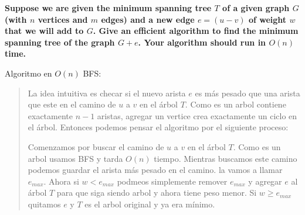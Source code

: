 \textbf{Suppose we are given the minimum spanning tree $T$ of a given graph $G$ (with $n$ vertices and $m$ edges) and a new edge $e = (u - v)$ of weight $w$ that we will add to $G$. Give an efficient algorithm to find the minimum spanning tree of the graph $G + e$. Your algorithm should run in $O(n)$ time.}\vspace{.2cm}

\textcolor{bibi}{Algoritmo en $O(n)$ BFS:} 
\begin{quote}
    La idea intuitiva es checar si el nuevo arista $e$ es más pesado que una arista que este en el camino de $u$ a $v$ en el árbol $T$. Como es un arbol contiene exactamente $n-1$ aristas, agregar un vertice crea exactamente un ciclo en el árbol. Entonces podemos pensar el algoritmo por el siguiente proceso: \vspace{.2cm}

    Comenzamos por buscar el camino de $u$ a $v$ en el árbol $T$. Como es un arbol usamos BFS y tarda $O(n)$ tiempo. Mientras buscamos este camino podemos guardar el arista más pesado en el camino. la vamos a llamar $e_{max}$. Ahora si $w < e_{max}$ podmeos simplemente remover $e_{max}$ y agregar $e$ al árbol $T$ para que siga siendo arbol y ahora tiene peso menor. Si $w \geq e_{max}$ quitamos $e$ y $T$ es el arbol original y ya era mínimo. \vspace{.2cm} 
\end{quote}